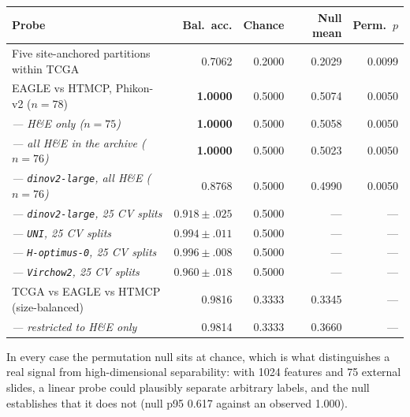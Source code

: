 \documentclass[11pt,a4paper]{article}
\begin{document}
\begin{center}
\begin{tabular}{@{}lrrrr@{}}
\toprule
\textbf{Probe} & \textbf{Bal.\ acc.} & \textbf{Chance} & \textbf{Null mean} & \textbf{Perm.\ $p$} \\
\midrule
Five site-anchored partitions within TCGA & 0.7062 & 0.2000 & 0.2029 & 0.0099 \\
EAGLE vs HTMCP, Phikon-v2 ($n=78$) & \textbf{1.0000} & 0.5000 & 0.5074 & 0.0050 \\
\quad \emph{--- H\&E only ($n=75$)} & \textbf{1.0000} & 0.5000 & 0.5058 & 0.0050 \\
\quad \emph{--- all H\&E in the archive ($n=76$)} & \textbf{1.0000} & 0.5000 & 0.5023 & 0.0050 \\
\quad \emph{--- \texttt{dinov2-large}, all H\&E ($n=76$)} & 0.8768 & 0.5000 & 0.4990 & 0.0050 \\
\quad \emph{--- \texttt{dinov2-large}, 25 CV splits} & $0.918{\pm}.025$ & 0.5000 & --- & --- \\
\quad \emph{--- \texttt{UNI}, 25 CV splits} & $0.994{\pm}.011$ & 0.5000 & --- & --- \\
\quad \emph{--- \texttt{H-optimus-0}, 25 CV splits} & $0.996{\pm}.008$ & 0.5000 & --- & --- \\
\quad \emph{--- \texttt{Virchow2}, 25 CV splits} & $0.960{\pm}.018$ & 0.5000 & --- & --- \\
TCGA vs EAGLE vs HTMCP (size-balanced) & 0.9816 & 0.3333 & 0.3345 & --- \\
\quad \emph{--- restricted to H\&E only} & 0.9814 & 0.3333 & 0.3660 & --- \\
\bottomrule
\end{tabular}
\end{center}

In every case the permutation null sits at chance, which is what distinguishes a real signal
from high-dimensional separability: with 1024 features and 75 external slides, a linear probe
could plausibly separate arbitrary labels, and the null establishes that it does not (null p95
0.617 against an observed 1.000).
\end{document}
